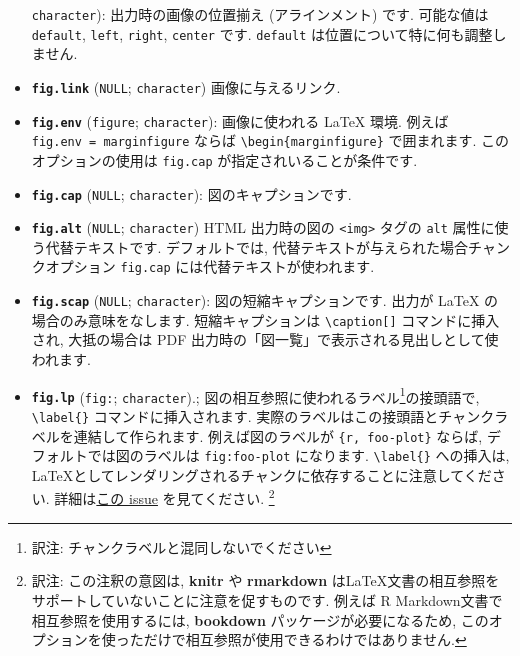 \documentclass[
  lualatex,ja=standard,jafont=noto-otf]{bxjsreport}
\begin{document}
\begin{itemize}
  \texttt{character}): 出力時の画像の位置揃え (アラインメント) です.
  可能な値は \texttt{default}, \texttt{left}, \texttt{right},
  \texttt{center} です. \texttt{default}
  は位置について特に何も調整しません.
\item
  \textbf{\texttt{fig.link}} (\texttt{NULL}; \texttt{character})
  画像に与えるリンク.
\item
  \textbf{\texttt{fig.env}}
  (\texttt{\textquotesingle{}figure\textquotesingle{}};
  \texttt{character}): 画像に使われる LaTeX 環境. 例えば
  \texttt{fig.env\ =\ \textquotesingle{}marginfigure\textquotesingle{}}
  ならば \texttt{\textbackslash{}begin\{marginfigure\}} で囲まれます.
  このオプションの使用は \texttt{fig.cap} が指定されいることが条件です.
\item
  \textbf{\texttt{fig.cap}} (\texttt{NULL}; \texttt{character}):
  図のキャプションです.
\item
  \textbf{\texttt{fig.alt}} (\texttt{NULL}; \texttt{character}) HTML
  出力時の図の \texttt{\textless{}img\textgreater{}} タグの \texttt{alt}
  属性に使う代替テキストです. デフォルトでは,
  代替テキストが与えられた場合チャンクオプション \texttt{fig.cap}
  には代替テキストが使われます.
\item
  \textbf{\texttt{fig.scap}} (\texttt{NULL}; \texttt{character}):
  図の短縮キャプションです. 出力が LaTeX の場合のみ意味をなします.
  短縮キャプションは \texttt{\textbackslash{}caption{[}{]}}
  コマンドに挿入され, 大抵の場合は PDF
  出力時の「図一覧」で表示される見出しとして使われます.
\item
  \textbf{\texttt{fig.lp}}
  (\texttt{\textquotesingle{}fig:\textquotesingle{}};
  \texttt{character}).;
  図の相互参照に使われるラベル\footnote{訳注:
    チャンクラベルと混同しないでください}の接頭語で,
  \texttt{\textbackslash{}label\{\}} コマンドに挿入されます.
  実際のラベルはこの接頭語とチャンクラベルを連結して作られます.
  例えば図のラベルが
  \texttt{\textasciigrave{}\textasciigrave{}\textasciigrave{}\{r,\ foo-plot\}}
  ならば, デフォルトでは図のラベルは \texttt{fig:foo-plot} になります.
  \texttt{\textbackslash{}label\{\}} への挿入は,
  LaTeXとしてレンダリングされるチャンクに依存することに注意してください.
  詳細は\href{https://github.com/rstudio/rmarkdown/issues/2391}{この
  issue} を見てください. \footnote{訳注: この注釈の意図は,
    \textbf{knitr} や \textbf{rmarkdown}
    はLaTeX文書の相互参照をサポートしていないことに注意を促すものです.
    例えば R Markdown文書で相互参照を使用するには, \textbf{bookdown}
    パッケージが必要になるため,
    このオプションを使っただけで相互参照が使用できるわけではありません.}

\end{itemize}
\end{document}
